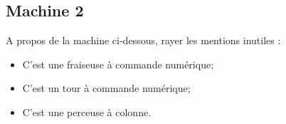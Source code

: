 \documentclass[12pt]{article}
\newcounter{exo}
\newenvironment{exo}{\stepcounter{exo}\vspace{0.5cm}{\bfseries Question \theexo\ :}}{\par\vspace{0.5cm}}
\begin{document}








\subsection{Machine 2}

\begin{exo}\label{exo1} A propos de la machine ci-dessous, rayer les mentions inutiles :
\begin{itemize}
    \item C'est une fraiseuse à commande numérique;
    \item C'est un tour à commande numérique;
    \item C'est une perceuse à colonne.
\end{itemize}
\end{exo}
\end{document}
